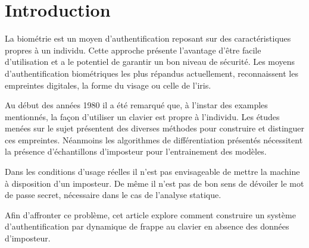 \section{Introduction}

La biométrie est un moyen d'authentification reposant sur des caractéristiques propres à un individu. Cette approche présente l'avantage d'être facile d'utilisation et a le potentiel de garantir un bon niveau de sécurité. Les moyens d'authentification biométriques les plus répandus actuellement, reconnaissent les empreintes digitales, la forme du visage ou celle de l’iris.

Au début des années 1980 il a été remarqué que, à l’instar des examples mentionnés, la façon d’utiliser un clavier est propre à l’individu. Les études menées sur le sujet présentent des diverses méthodes pour construire et distinguer ces empreintes. Néanmoins les algorithmes de différentiation présentés nécessitent la présence d'échantillons d’imposteur pour l'entrainement des modèles.

Dans les conditions d'usage réelles il n'est pas envisageable de mettre la machine à disposition d'un imposteur. De même il n'est pas de bon sens de dévoiler le mot de passe secret, nécessaire dans le cas de l'analyse statique.

Afin d’affronter ce problème, cet article explore comment construire un système d'authentification par dynamique de frappe au clavier en absence des données d’imposteur.


